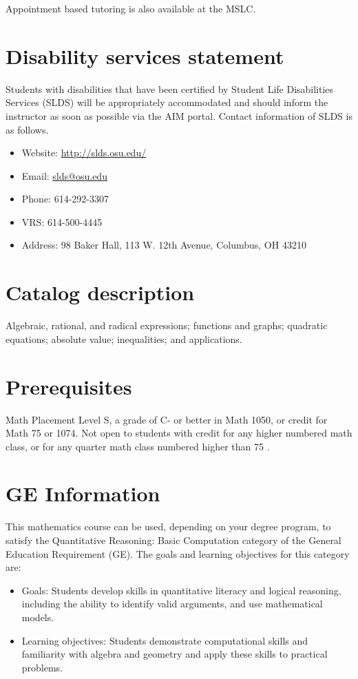 \documentclass{ximera}
\begin{document}
Appointment based tutoring is also available at the MSLC.

\section*{Disability services statement}
Students with disabilities that have been certified by Student Life Disabilities Services (SLDS) will be appropriately accommodated and should inform the instructor as soon as possible via the AIM portal. Contact information of SLDS is as follows.

\begin{itemize}
  \item Website: \href{http://slds.osu.edu/}{http://slds.osu.edu/}
  \item Email: \href{mailto:slds@osu.edu}{slds@osu.edu}
  \item Phone: 614-292-3307
  \item VRS: 614-500-4445
  \item Address: 98 Baker Hall, 113 W. 12th Avenue, Columbus, OH 43210
\end{itemize}

\section*{Catalog description}
Algebraic, rational, and radical expressions; functions and graphs; quadratic equations; absolute value; inequalities; and applications.

\section*{Prerequisites}
Math Placement Level S, a grade of C- or better in Math 1050, or credit for Math 75 or 1074. Not open to students with credit for any higher numbered math class, or for any quarter math class numbered higher than 75 .

\section*{GE Information}
This mathematics course can be used, depending on your degree program, to satisfy the Quantitative Reasoning: Basic Computation category of the General Education Requirement (GE). The goals and learning objectives for this category are:

\begin{itemize}
  \item Goals: Students develop skills in quantitative literacy and logical reasoning, including the ability to identify valid arguments, and use mathematical models.
  \item Learning objectives: Students demonstrate computational skills and familiarity with algebra and geometry and apply these skills to practical problems.
\end{itemize}
\end{document}
